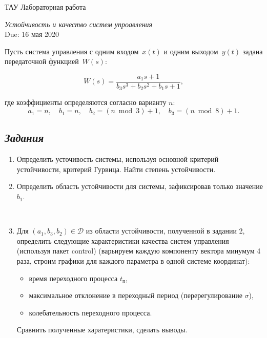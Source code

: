 \documentclass[a4paper,oneside,10pt]{book}
\theoremstyle{definition}
\begin{document}
	
	
	\begin{center}
		{\large  ТАУ \hspace{0.1cm} Лабораторная работа }
		
		\vspace{5pt}
		\textit{\large Устойчивость и качество систем упроавления}\\ %
		\vspace{10pt}
		Due: 16 мая 2020 %
	\end{center}
	
	\vspace{0.2 cm}
	
	
	
	Пусть система управления с одним входом~$ x(t) $ и одним выходом~$ y(t) $ задана  передаточной функцией~$ W(s) $: 
	
	\begin{equation*}
			W(s) = 
		\dfrac{a_1 s+1}
		{b_3 s^3 + b_2 s^2 + b_1 s +1} , 
	\end{equation*}
	
	где коэффициенты  определяются согласно варианту $ n $: 
	\begin{equation*}
		a_1 = n, \quad b_1 = n, \quad b_2 = (n\bmod 3) + 1, \quad b_3 = (n \bmod 8) + 1.  
	\end{equation*}
	
	\subsection*{\textit{Задания}}
	
	\begin{enumerate}
		\item
		Определить усточивость системы, используя основной критерий устойчивости, критерий Гурвица. Найти степень устойчивости. 
		\item
		Определить область устойчивости для системы, зафиксировав только значение $ b_1 $.  
		
		\
		
		
		\item 
		Для   $(a_1, b_3, b_2)  \in \mathcal{D}$ из области устойчивости, полученной в задании 2, определить следующие характеристики качества систем управления (используя пакет control) (варьируем каждую компоненту вектора минумум 4 раза, строим графики для каждого параметра в одной системе координат): 
		\begin{itemize}
			\item
			время переходного процесса $ t_{\text{п}} $,
			\item
			максимальное отклонение в переходный период (перерегулирование $ \sigma $),
			\item
			колебательность переходного процесса.
			
		\end{itemize}
		
		Сравнить полученные харатеристики, сделать выводы. 
	\end{enumerate}
	
	
	
\end{document}

